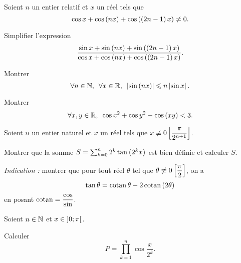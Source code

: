 \begin{exo}[Exercice 4]
Soient \(n\) un entier relatif et \(x\) un réel tels que \[\cos x+\cos\left(nx\right)+\cos\left(\left(2n-1\right)x\right)\not=0.\]

Simplifier l'expression \[\dfrac{\sin x+\sin\left(nx\right)+\sin\left(\left(2n-1\right)x\right)}{\cos x+\cos\left(nx\right)+\cos\left(\left(2n-1\right)x\right)}.\]
\end{exo}

\begin{corr}
\end{corr}

\begin{exo}[Exercice 5]
Montrer \[\quantifs{\forall n\in\N;\forall x\in\R}\abs{\sin\paren{nx}}\leq n\abs{\sin x}.\]
\end{exo}

\begin{corr}
\end{corr}

\begin{exo}[Exercice 6]
Montrer \[\quantifs{\forall x,y\in\R}\cos x^2+\cos y^2-\cos\paren{xy}<3.\]
\end{exo}

\begin{corr}
\end{corr}

\begin{exo}[Exercice 7]
Soient \(n\) un entier naturel et \(x\) un réel tels que \(x\not\equiv0\left[\dfrac{\pi}{2^{n+1}}\right]\).

Montrer que la somme \(S=\sum_{k=0}^{n}2^k\tan\left(2^kx\right)\) est bien définie et calculer \(S\).

\textit{Indication :} montrer que pour tout réel \(\theta\) tel que \(\theta\not\equiv0\left[\dfrac{\pi}{2}\right]\), on a \[\tan\theta=\operatorname{cotan}\theta-2\operatorname{cotan}\left(2\theta\right)\] en posant \(\operatorname{cotan}=\dfrac{\cos}{\sin}\).
\end{exo}

\begin{corr}
\end{corr}

\begin{exo}[Exercice 8]
Soient \(n\in\mathbb{N}\) et \(x\in\left]0;\pi\right[\).

Calculer \[P=\prod_{k=1}^{n}\cos\dfrac{x}{2^k}.\]
\end{exo}

\begin{corr}
\end{corr}

